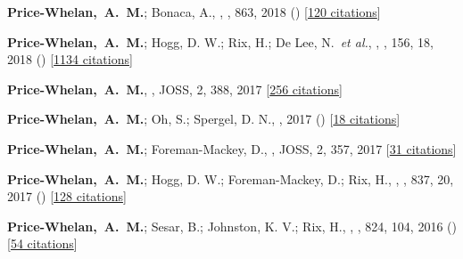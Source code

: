 \item[{\color{deemph}\scriptsize13}]\textbf{Price-Whelan,~A.~M.}; Bonaca, A., , \apj, 863, 2018 () [\href{http://adsabs.harvard.edu/abs/2018ApJ...863L..20P}{120 citations}]

\item[{\color{deemph}\scriptsize12}]\textbf{Price-Whelan,~A.~M.}; Hogg, D. W.; Rix, H.; De Lee, N.~\textit{et al.}, , \aj, 156, 18, 2018 () [\href{http://adsabs.harvard.edu/abs/2018AJ....156...18P}{1134 citations}]

\item[{\color{deemph}\scriptsize11}]\textbf{Price-Whelan,~A.~M.}, , JOSS, 2, 388, 2017 [\href{http://adsabs.harvard.edu/abs/2017JOSS....2..388P}{256 citations}]

\item[{\color{deemph}\scriptsize10}]\textbf{Price-Whelan,~A.~M.}; Oh, S.; Spergel, D. N., , 2017 () [\href{http://adsabs.harvard.edu/abs/2017arXiv170903532P}{18 citations}]

\item[{\color{deemph}\scriptsize9}]\textbf{Price-Whelan,~A.~M.}; Foreman-Mackey, D., , JOSS, 2, 357, 2017 [\href{http://adsabs.harvard.edu/abs/2017JOSS....2..357P}{31 citations}]

\item[{\color{deemph}\scriptsize8}]\textbf{Price-Whelan,~A.~M.}; Hogg, D. W.; Foreman-Mackey, D.; Rix, H., , \apj, 837, 20, 2017 () [\href{http://adsabs.harvard.edu/abs/2017ApJ...837...20P}{128 citations}]

\item[{\color{deemph}\scriptsize7}]\textbf{Price-Whelan,~A.~M.}; Sesar, B.; Johnston, K. V.; Rix, H., , \apj, 824, 104, 2016 () [\href{http://adsabs.harvard.edu/abs/2016ApJ...824..104P}{54 citations}]

